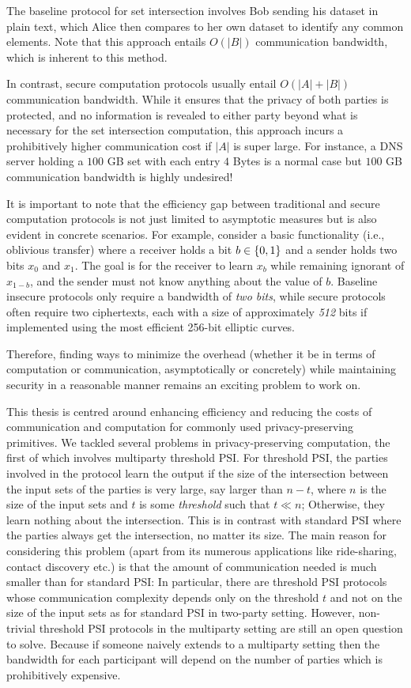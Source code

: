 The baseline protocol for set intersection involves Bob sending his dataset in plain text, which Alice then compares to her own dataset to identify any common elements. Note that this approach entails $O(|B|)$ communication bandwidth, which is inherent to this method.

In contrast, secure computation protocols usually entail $O(|A|+|B|)$ communication bandwidth. While it ensures that the privacy of both parties is protected, and no information is revealed to either party beyond what is necessary for the set intersection computation, this approach incurs a prohibitively higher communication cost if $|A|$ is super large. For instance, a DNS server holding a $100$ GB set with each entry $4$ Bytes is a normal case but $100$ GB communication bandwidth is highly undesired!

It is important to note that the efficiency gap between traditional and secure computation protocols is not just limited to asymptotic measures but is also evident in concrete scenarios. For example, consider a basic functionality (i.e., oblivious transfer) where a receiver holds a bit $b \in \{0,1\}$ and a sender holds two bits $x_0$ and $x_1$. The goal is for the receiver to learn $x_b$ while remaining ignorant of $x_{1-b}$, and the sender must not know anything about the value of $b$. Baseline insecure protocols only require a bandwidth of \emph{two bits}, while secure protocols often require two ciphertexts, each with a size of approximately \emph{512} bits if implemented using the most efficient 256-bit elliptic curves.

Therefore, finding ways to minimize the overhead (whether it be in terms of computation or communication, asymptotically or concretely) while maintaining security in a reasonable manner remains an exciting problem to work on.

This thesis is centred around enhancing efficiency and reducing the costs of communication and computation for commonly used privacy-preserving primitives.
We tackled several problems in privacy-preserving computation, the first of which involves multiparty threshold PSI.
For threshold PSI, the parties involved in the protocol learn the output if the size of the intersection between the input sets of the parties is very large, say larger than $n-t$, where $n$ is the size of the input sets and $t$ is some \emph{threshold} such that $t\ll n$; Otherwise, they learn nothing about the intersection. This is in contrast with standard PSI where the parties always get the intersection, no matter its size.
The main reason for considering this problem (apart from its numerous applications like ride-sharing, contact discovery etc.) is that the amount of communication needed is much smaller than for standard PSI: In particular, there are threshold PSI protocols whose communication complexity depends only on the threshold $t$ and not on the size of the input sets as for standard PSI \cite{C:GhoSim19} in two-party setting. 
However, non-trivial threshold PSI protocols in the multiparty setting are still an open question to solve. Because if someone naively extends \cite{C:GhoSim19} to a multiparty setting then the bandwidth for each participant will depend on the number of parties which is prohibitively expensive.

